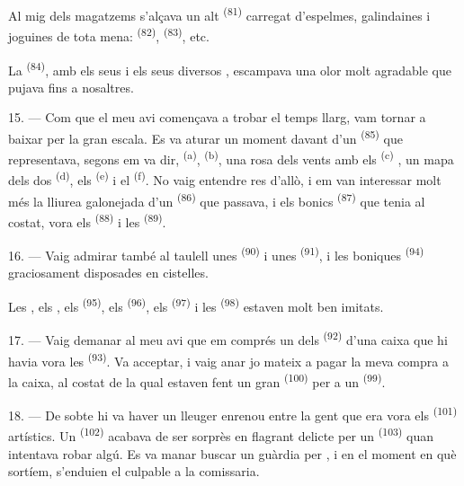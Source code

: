 Al mig dels magatzems s'alçava un alt  \textsuperscript{(81)} carregat
d'espelmes, galindaines i joguines de tota mena:
 \textsuperscript{(82)}, 
\textsuperscript{(83)}, etc.

La  \textsuperscript{(84)}, amb els seus  i els seus
diversos , escampava una olor molt agradable que pujava fins a nosaltres.

\VUsaut{3.4mm}
\VUsaut{2.8mm}

15. --- Com que el meu avi començava a trobar el temps llarg, vam tornar a baixar per la gran
escala. Es va aturar un moment davant d'un  \textsuperscript{(85)}
que representava, segons em va dir,
 \textsuperscript{(a)}, 
\textsuperscript{(b)}, una rosa dels vents amb els 
\textsuperscript{(c)} , un mapa dels dos
 \textsuperscript{(d)}, els 
\textsuperscript{(e)} i el  \textsuperscript{(f)}. No vaig entendre res
d'allò, i em van interessar molt més la lliurea galonejada d'un
 \textsuperscript{(86)} que passava, i els bonics
 \textsuperscript{(87)} que tenia al costat, vora els
 \textsuperscript{(88)} i les 
\textsuperscript{(89)}.

16. --- Vaig admirar també al taulell unes  \textsuperscript{(90)} i unes
 \textsuperscript{(91)}, i les boniques 
\textsuperscript{(94)} graciosament disposades en cistelles.

Les , els , els  \textsuperscript{(95)}, els
 \textsuperscript{(96)}, els
 \textsuperscript{(97)} i les 
\textsuperscript{(98)} estaven molt ben imitats.

\VUsaut{4.4mm}
\VUsaut{2.8mm}

17. --- Vaig demanar al meu avi que em comprés un dels 
\textsuperscript{(92)} d'una caixa que hi havia vora les 
\textsuperscript{(93)}. Va acceptar, i vaig anar jo mateix a pagar la meva compra a la caixa,
al costat de la qual estaven fent un gran  \textsuperscript{(100)} per a un
 \textsuperscript{(99)}.

18. --- De sobte hi va haver un lleuger enrenou entre la gent que era vora els
 \textsuperscript{(101)} artístics. Un 
\textsuperscript{(102)} acabava de ser sorprès en flagrant delicte per un
 \textsuperscript{(103)} quan intentava robar
algú. Es va manar buscar un guàrdia per , i en el moment en què sortíem,
s'enduien el culpable a la comissaria.
\VUsaut{6.0mm}
\VUfilet{22mm}
